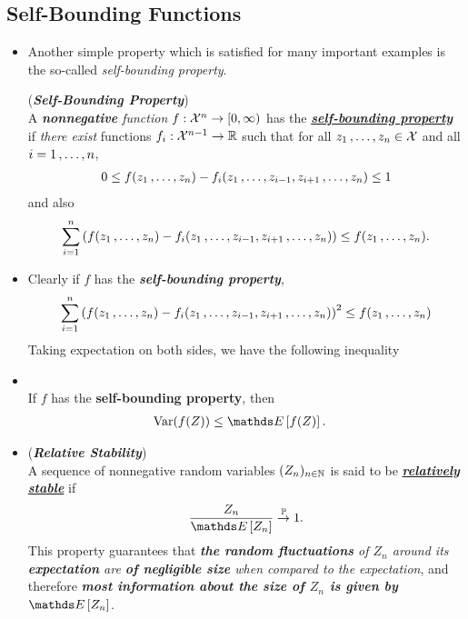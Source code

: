 \documentclass[11pt]{article}
\begin{document}
\subsection{Self-Bounding Functions}\label{sec: self_bounding}
\begin{itemize}
\item Another simple property which is satisfied for many important examples is the so-called \emph{self-bounding property}. 
\begin{definition} (\emph{\textbf{Self-Bounding Property}})\\
A \emph{\textbf{nonnegative} function} $f: {\mathcal X}^n  \to [0, \infty)$ has the \underline{\emph{\textbf{self-bounding property}}} if \emph{there exist} functions $f_i: {\mathcal X}^{n-1} \to {\mathbb R}$ such that for all $z_1 \,{,}\ldots{,}\, z_n \in {\mathcal X}$ and all $i = 1 \,{,}\ldots{,}\, n$,
\begin{align}
0 \le  f(z_1 \,{,}\ldots{,}\, z_n) - f_i(z_1 \,{,}\ldots{,}\, z_{i-1}, z_{i+1} \,{,}\ldots{,}\, z_n) \le 1 \label{eqn: self_bounding_1}
\end{align}
and also
\begin{align}
\sum_{i=1}^{n}\left(f(z_1 \,{,}\ldots{,}\, z_n) - f_i(z_1 \,{,}\ldots{,}\, z_{i-1}, z_{i+1} \,{,}\ldots{,}\, z_n)\right)  \le  f(z_1 \,{,}\ldots{,}\, z_n). \label{eqn: self_bounding_2}
\end{align}
\end{definition}

\item \begin{remark}
Clearly if $f$ has the \textbf{\emph{self-bounding property}}, 
\begin{align}
\sum_{i=1}^{n}\left(f(z_1 \,{,}\ldots{,}\, z_n) - f_i(z_1 \,{,}\ldots{,}\, z_{i-1}, z_{i+1} \,{,}\ldots{,}\, z_n)\right)^2  \le  f(z_1 \,{,}\ldots{,}\, z_n) \label{eqn: self_bounding_3}
\end{align} Taking expectation on both sides, we have the following inequality
\end{remark}

\item \begin{corollary} \citep{boucheron2013concentration}\\
If $f$ has the \textbf{self-bounding property}, then
\begin{align*}
\text{Var}(f(Z)) &\le \E{}{f(Z)}.
\end{align*}
\end{corollary}

\item \begin{remark} (\emph{\textbf{Relative Stability}}) \citep{boucheron2013concentration}\\
A sequence of nonnegative random variables $(Z_n)_{n\in {\mathbb N}}$ is said to be \underline{\emph{\textbf{relatively stable}}} if 
\begin{align*}
\frac{Z_n}{\E{}{Z_n}} \stackrel{\bP}{\rightarrow} 1.
\end{align*}
This property guarantees that \emph{\textbf{the random fluctuations} of $Z_n$ around its \textbf{expectation} are \textbf{of negligible size} when compared to the expectation}, and therefore \emph{\textbf{most information about the size of $Z_n$ is given by $\E{}{Z_n}$}}. 


\end{remark}
\end{itemize}
\end{document}
